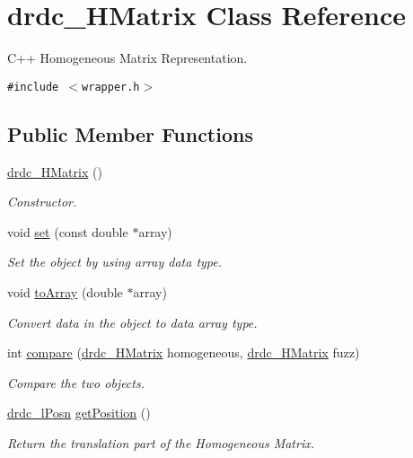 \hypertarget{classdrdc__HMatrix}{
\section{drdc\_\-HMatrix Class Reference}
\label{classdrdc__HMatrix}
}
C++ Homogeneous Matrix Representation.  


{\tt \#include $<$wrapper.h$>$}

\subsection*{Public Member Functions}
\begin{CompactItemize}
\item 
\hyperlink{classdrdc__HMatrix_d9fed0c7347760fbf770c4b06d06da0b}{drdc\_\-HMatrix} ()
\begin{CompactList}\small\item\em Constructor. \item\end{CompactList}\item 
void \hyperlink{classdrdc__HMatrix_ce6e722fa2bb72ffcf049dcca10a3244}{set} (const double $\ast$array)
\begin{CompactList}\small\item\em Set the object by using array data type. \item\end{CompactList}\item 
void \hyperlink{classdrdc__HMatrix_efc643c73c028a28530cdd1312f2b9ea}{toArray} (double $\ast$array)
\begin{CompactList}\small\item\em Convert data in the object to data array type. \item\end{CompactList}\item 
int \hyperlink{classdrdc__HMatrix_5e948bc0daf09f8fd9e780683303b995}{compare} (\hyperlink{classdrdc__HMatrix}{drdc\_\-HMatrix} homogeneous, \hyperlink{classdrdc__HMatrix}{drdc\_\-HMatrix} fuzz)
\begin{CompactList}\small\item\em Compare the two objects. \item\end{CompactList}\item 
\hyperlink{classdrdc__lPosn}{drdc\_\-lPosn} \hyperlink{classdrdc__HMatrix_2e28d6ec867b30ca11e5054fe2854cc1}{getPosition} ()
\begin{CompactList}\small\item\em Return the translation part of the Homogeneous Matrix. \item\end{CompactList}\item 

\end{CompactItemize}
